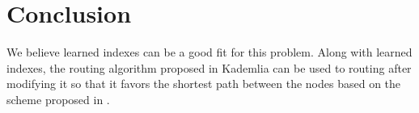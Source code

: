 \section{Conclusion}

We believe learned indexes can be a good fit for this problem. Along with
learned indexes, the routing algorithm proposed in Kademlia can be used to
routing after modifying it so that it favors the shortest path between the nodes
based on the scheme proposed in \citet{mengweiImprovementKademliaBased2013}.
